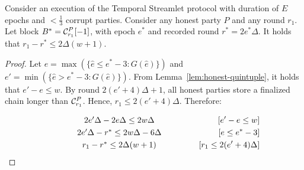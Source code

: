 \begin{lemma} \label{lem:latest-finalized-round}
  Consider an execution of the Temporal Streamlet protocol with duration
  of $E$ epochs and $< \frac{1}{3}$ corrupt parties.
  Consider any honest party $P$ and any round $r_1$. Let block
  $B^* = \mathcal{C}^P_{r_1}[-1]$, with
  epoch $e^*$ and recorded round $r^* = 2e^*\Delta$.
  It holds that $r_1 - r^* \leq 2\Delta(w + 1)$.
\end{lemma}
\begin{proof}
  Let $e = \max(\{\hat e \leq e^* - 3: G(\hat e)\})$ and $e' = \min(\{\hat e > e^* - 3: G(\hat e)\})$.
  From Lemma~\ref{lem:honest-quintuple}, it holds that $e' - e \leq w$.
  By round $2 (e' + 4) \Delta + 1$, all honest parties store a finalized
  chain longer than $\mathcal{C}^P_{r_1}$. Hence, $r_1 \leq 2 (e' + 4)\Delta$.
  Therefore:

  \begin{align*}
    \makebox[0.5\textwidth][c]{$2e' \Delta - 2e \Delta \leq 2w\Delta$}           && \text{[$e' - e \leq w$]}\\
    \makebox[0.5\textwidth][c]{$2e' \Delta - r^* \leq 2w\Delta - 6\Delta$}       && \text{[$e \leq e^* - 3$]} \\
    \makebox[0.5\textwidth][c]{$r_1 - r^* \leq 2\Delta(w + 1)$}                  && \text{[$r_1 \leq 2 (e' + 4)\Delta$]}
  \end{align*}
  \Qed
\end{proof}


